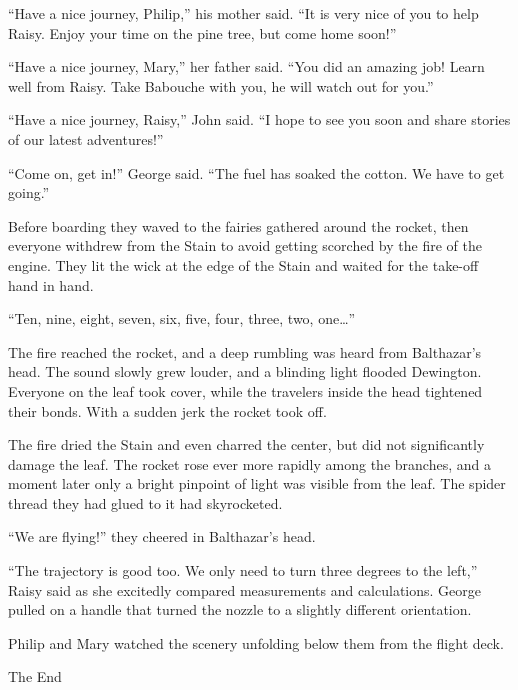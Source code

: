 \documentclass[10pt, draft]{memoir}
\begin{document}
``Have a nice journey, Philip,'' his mother said. ``It is very nice of you to
help Raisy. Enjoy your time on the pine tree, but come home soon!''

``Have a nice journey, Mary,'' her father said. ``You did an amazing job! Learn
well from Raisy. Take Babouche with you, he will watch out for you.''

``Have a nice journey, Raisy,'' John said. ``I hope to see you soon and share
stories of our latest adventures!''

``Come on, get in!'' George said. ``The fuel has soaked the cotton. We have to
get going.''

Before boarding they waved to the fairies gathered around the rocket, then
everyone withdrew from the Stain to avoid getting scorched by the fire of the
engine. They lit the wick at the edge of the Stain and waited for the take-off
hand in hand.

``Ten, nine, eight, seven, six, five, four, three, two, one\dots''

The fire reached the rocket, and a deep rumbling was heard from Balthazar's
head. The sound slowly grew louder, and a blinding light flooded Dewington.
Everyone on the leaf took cover, while the travelers inside the head tightened
their bonds. With a sudden jerk the rocket took off.

The fire dried the Stain and even charred the center, but did not significantly
damage the leaf. The rocket rose ever more rapidly among the branches, and a
moment later only a bright pinpoint of light was visible from the leaf. The
spider thread they had glued to it had skyrocketed.

``We are flying!'' they cheered in Balthazar's head.

``The trajectory is good too. We only need to turn three degrees to the left,''
Raisy said as she excitedly compared measurements and calculations. George
pulled on a handle that turned the nozzle to a slightly different orientation.

Philip and Mary watched the scenery unfolding below them from the flight deck.

\begin{center}
The End
\end{center}%
\end{document}
